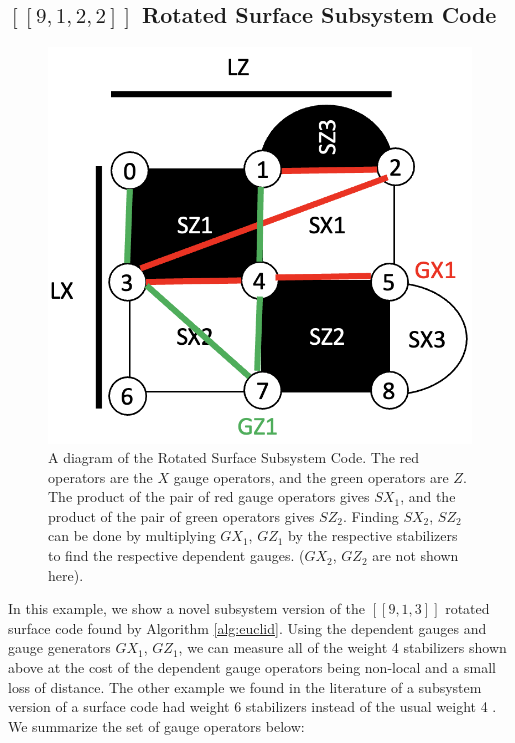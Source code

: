 \documentclass[conference]{IEEEtran}
\newcommand{\llbr}{[\![}
\newcommand{\rrbr}{]\!]}
\begin{document}
\subsection{$\llbr 9,1,2,2 \rrbr$ Rotated Surface Subsystem Code}



\begin{figure}[ht]
 \includegraphics[scale=0.6]{surfacesubsystem1.png}
\centering
\caption{A diagram of the Rotated Surface Subsystem Code. The red operators are the $X$ gauge operators, and the green operators are $Z$. The product of the pair of red gauge operators gives $SX_{1}$, and the product of the pair of green operators gives $SZ_{2}$. Finding $SX_{2}$, $SZ_{2}$ can be done by multiplying $GX_{1}$, $GZ_{1}$ by the respective stabilizers to find the respective dependent gauges. ($GX_{2}$, $GZ_{2}$ are not shown here).}
\end{figure}
In this example, we show a novel subsystem version of the $\llbr 9,1,3 \rrbr$ rotated surface code found by Algorithm \eqref{alg:euclid}. Using the dependent gauges and gauge generators $GX_{1}$, $GZ_{1}$, we can measure all of the weight 4 stabilizers shown above at the cost of the dependent gauge operators being non-local and a small loss of distance. The other example we found in the literature of a subsystem version of a surface code had weight 6 stabilizers instead of the usual weight 4 \cite{higgott2021subsystem}. We summarize the set of gauge operators below: 
\end{document}
